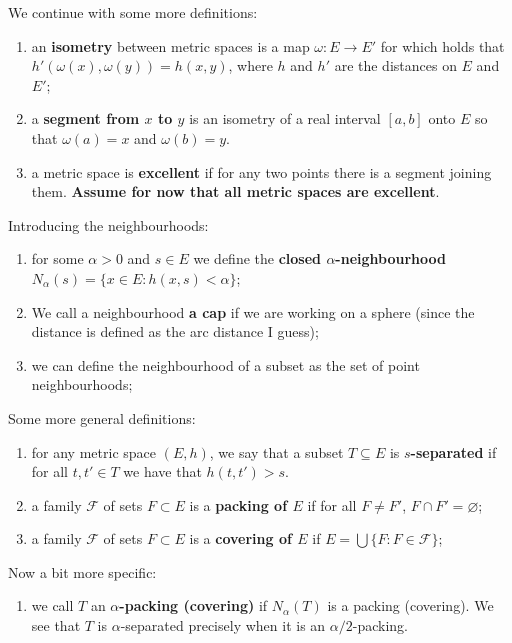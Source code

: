 \documentclass[a4paper, 10pt]{article}
\begin{document}
  We continue with some more definitions:
  \begin{enumerate}
    \item an \textbf{isometry} between metric spaces is a map $\omega: E
      \rightarrow E'$ for which holds that $h'(\omega(x), \omega(y)) = h(x,y)$,
      where $h$ and $h'$ are the distances on $E$ and $E'$;
    \item a \textbf{segment from $x$ to $y$} is an isometry of a real interval
      $[a,b]$ onto $E$ so that $\omega(a) = x$ and $\omega(b) = y$.
    \item a metric space is \textbf{excellent} if for any two points there is a
      segment joining them. \textbf{Assume for now that all metric spaces are
      excellent}.
  \end{enumerate}
  
  Introducing the neighbourhoods:

  \begin{enumerate}
    \item for some $\alpha>0$ and $s \in E$ we define the \textbf{closed
      $\alpha$-neighbourhood} $N_{\alpha}(s) = \{x\in E : h(x,s) < \alpha\}$;
    \item We call a neighbourhood \textbf{a cap} if we are working on a sphere
      (since the distance is defined as the arc distance I guess);
    \item we can define the neighbourhood of a subset as the set of point
      neighbourhoods;
  \end{enumerate}

  Some more general definitions:
  \begin{enumerate}
    \item for any metric space $(E,h)$, we say that a subset $T \subseteq E$ is
      \textbf{$s$-separated} if for all $t,t' \in T$ we have that $h(t,t') > s$.
    \item a family $\mathcal{F}$ of sets $F \subset E$ is a \textbf{packing of
      $E$} if for all $F \neq F'$, $F \cap F' = \varnothing$;
    \item a family $\mathcal{F}$ of sets $F \subset E$ is a \textbf{covering of
      $E$} if $E = \bigcup\{F : F \in \mathcal{F}\}$;
  \end{enumerate}

  Now a bit more specific:
  \begin{enumerate}
    \item we call $T$ an \textbf{$\alpha$-packing (covering)} if $N_{\alpha}(T)$
      is a packing (covering). We see that $T$ is $\alpha$-separated precisely
      when it is an $\alpha/2$-packing.
  \end{enumerate}
\end{document}
